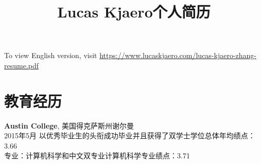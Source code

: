 \documentclass[margin]{res}
\title{Lucas Kjaero个人简历}
\begin{document}
\begin{CJK*}{UTF8}{gbsn}




\address{电话号码：+1 \(619\) 905-1772\\永久住址： San Diego, CA 92123}
\address{邮箱地址：\href{mailto:lucas@lucaskjaerozhang.com}{Lucas@LucasKjaeroZhang.com}\\个人网址：\href{https://www.lucaskjaerozhang.com}{www.LucasKjaeroZhang.com}}


\begin{resume}


\section{}
To view English version, visit \href{https://www.lucaskjaerozhang.com/lucas-kjaero-zhang-resume.pdf}{https://www.lucaskjaero.com/lucas-kjaero-zhang-resume.pdf}

\section{教育经历}
\textbf{Austin College}, 美国得克萨斯州谢尔曼\\
2015年5月 以优秀毕业生的头衔成功毕业并且获得了双学士学位\hfill 总体年均绩点：
3.66\\
专业：计算机科学和中文双专业\hfill 计算机科学专业绩点：3.71


\end{resume}
\end{CJK*}
\end{document}
